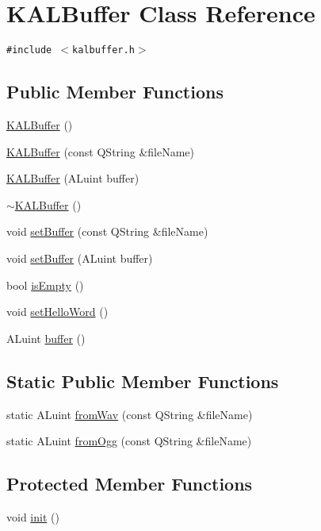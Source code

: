 \hypertarget{class_k_a_l_buffer}{
\section{KALBuffer Class Reference}
\label{class_k_a_l_buffer}
}
{\tt \#include $<$kalbuffer.h$>$}

\subsection*{Public Member Functions}
\begin{CompactItemize}
\item 
\hyperlink{class_k_a_l_buffer_12c9ce3c2f62d45a0a28bd9c9a34334e}{KALBuffer} ()
\item 
\hyperlink{class_k_a_l_buffer_41851d934abe0141cf801b8f8f7e2bac}{KALBuffer} (const QString \&fileName)
\item 
\hyperlink{class_k_a_l_buffer_85e879ab2de03e6e3899a8e31805db0b}{KALBuffer} (ALuint buffer)
\item 
\hyperlink{class_k_a_l_buffer_e8e1a2b13d0838c6ccebba469395107b}{$\sim$KALBuffer} ()
\item 
void \hyperlink{class_k_a_l_buffer_2b9b03fd3f9d785a10f28429bcd40e45}{setBuffer} (const QString \&fileName)
\item 
void \hyperlink{class_k_a_l_buffer_2029fa8a9f9b5711c10f647336b721bd}{setBuffer} (ALuint buffer)
\item 
bool \hyperlink{class_k_a_l_buffer_c415516ab1e3e4cd4e548f368e0c22ac}{isEmpty} ()
\item 
void \hyperlink{class_k_a_l_buffer_51db9c1d66fad6ac40ab71518691393e}{setHelloWord} ()
\item 
ALuint \hyperlink{class_k_a_l_buffer_a4cc82673706c46f2696f7bae40640b0}{buffer} ()
\end{CompactItemize}
\subsection*{Static Public Member Functions}
\begin{CompactItemize}
\item 
static ALuint \hyperlink{class_k_a_l_buffer_5ac5acdd54b7290392641712b57d4c5f}{fromWav} (const QString \&fileName)
\item 
static ALuint \hyperlink{class_k_a_l_buffer_151a3351cd7c10bea0ff78f78272b794}{fromOgg} (const QString \&fileName)
\end{CompactItemize}
\subsection*{Protected Member Functions}
\begin{CompactItemize}
\item 
void \hyperlink{class_k_a_l_buffer_92e4bff6c8b3fa4d30621ccd8a6a5dd2}{init} ()
\end{CompactItemize}


